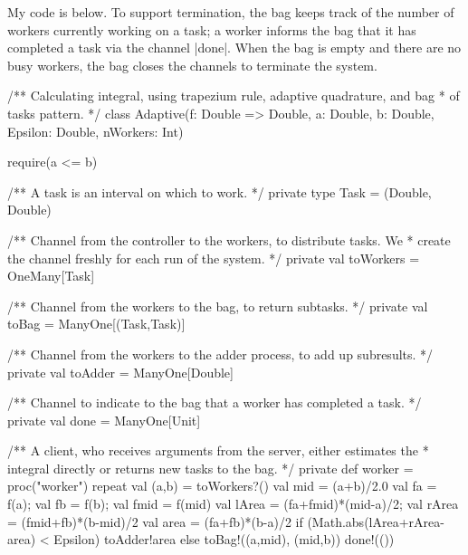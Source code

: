 
\begin{answer}
My code is below.  To support termination, the bag keeps track of the
number of workers currently working on a task; a worker informs the
bag that it has completed a task via the channel |done|.  When the bag
is empty and there are no busy workers, the bag closes the channels to
terminate the system.
%
\begin{scala}
/** Calculating integral, using trapezium rule, adaptive quadrature, and bag
  * of tasks pattern. */
class Adaptive(f: Double => Double, a: Double, b: Double, Epsilon: Double, nWorkers: Int){
  require(a <= b)

  /** A task is an interval on which to work. */
  private type Task = (Double, Double)

  /** Channel from the controller to the workers, to distribute tasks.  We
    * create the channel freshly for each run of the system. */
  private val toWorkers = OneMany[Task] 

  /** Channel from the workers to the bag, to return subtasks. */
  private val toBag = ManyOne[(Task,Task)]

  /** Channel from the workers to the adder process, to add up subresults. */
  private val toAdder = ManyOne[Double]

  /** Channel to indicate to the bag that a worker has completed a task. */
  private val done = ManyOne[Unit]

  /** A client, who receives arguments from the server, either estimates the
    * integral directly or returns new tasks to the bag. */
  private def worker = proc("worker"){
    repeat{
      val (a,b) = toWorkers?()
      val mid = (a+b)/2.0
      val fa = f(a); val fb = f(b); val fmid = f(mid)
      val lArea = (fa+fmid)*(mid-a)/2; val rArea = (fmid+fb)*(b-mid)/2
      val area = (fa+fb)*(b-a)/2
      if (Math.abs(lArea+rArea-area) < Epsilon) toAdder!area
      else toBag!((a,mid), (mid,b)) 
      done!(())
    }
  }

}
\end{scala}
\end{answer}
